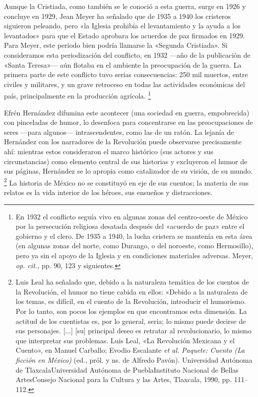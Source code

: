 \documentclass[14pt,twoside,final]{extbook} %
\let\oldfootnote\footnote
\renewcommand\footnote[1]{%
\oldfootnote{\hspace{1mm}#1}}
\begin{document}
Aunque la Cristiada, como también se le conoció a esta guerra, surge en 1926 y concluye en 1929, Jean Meyer ha señalado que de 1935 a 1940 los cristeros siguieron peleando, pero «la Iglesia prohibía el levantamiento y la ayuda a los levantados» para que el Estado aprobara los acuerdos de paz firmados en 1929. Para Meyer, este periodo bien podría llamarse la «Segunda Cristiada». Si consideramos esta
periodización del conflicto, en 1932 ---año de la publicación de «Santa Teresa»--- aún flotaba en el ambiente la preocupación de la guerra. La primera parte de este conflicto tuvo serias consecuencias: 250 mil muertos, entre civiles y militares, y un grave retroceso en todas las actividades económicas del país, principalmente en la producción agrícola.\footnote{En 1932 el conflicto seguía vivo en algunas zonas del centro-oeste de México por la persecución religiosa desatada después del «acuerdo de paz» entre el gobierno y el clero. De 1935 a 1940, la lucha cristera se mantenía en esta área (en algunas zonas del norte, como Durango, o del noroeste, como Hermosillo), pero ya sin el apoyo de la Iglesia y en condiciones materiales adversas. Meyer, \emph{op. cit.,} pp. 90, 123 y siguientes.}

Efrén Hernández difumina este acontecer (una sociedad en guerra, empobrecida) con pinceladas de humor, lo desenfoca para concentrarse en las preocupaciones de seres ---para algunos--- intrascendentes, como las de un ratón. La lejanía de Hernández con los narradores de la Revolución puede observarse precisamente ahí: mientras estos consideraron el marco histórico (sus actores y sus circunstancias) como elemento central de sus historias y excluyeron el humor de sus páginas, Hernández se lo apropia como catalizador de su visión, de su mundo.\footnote{Luis Leal ha señalado que, debido a la naturaleza temática de los cuentos de la Revolución, el humor no tiene cabida en ellos: «Debido a la naturaleza de los temas, es difícil, en el cuento de la Revolución, introducir el humorismo. Por lo tanto, son pocos los ejemplos en que encontramos esta dimensión. La actitud de los cuentistas es, por lo general, seria; lo mismo puede decirse de sus personajes. [...] [su] principal deseo es retratar al revolucionario, lo mismo que interpretar sus problemas. Luis Leal, «La Revolución Mexicana y el Cuento», en Manuel Carballo; Evodio Escalante \emph{et al.} \emph{Paquete: Cuento (La ficción en México)} (ed., pról. y ns. de Alfredo Pavón). Universidad Autónoma de Tlaxcala\kernedslash* Universidad Autónoma de Puebla\kernedslash* Instituto Nacional de Bellas Artes\kernedslash* Consejo Nacional para la Cultura y las Artes, Tlaxcala, 1990, pp. 111--112.} La historia de México no se constituyó en eje de sus cuentos; la materia de sus relatos es la vida interior de los héroes, sus ensueños y distracciones.
\end{document}
